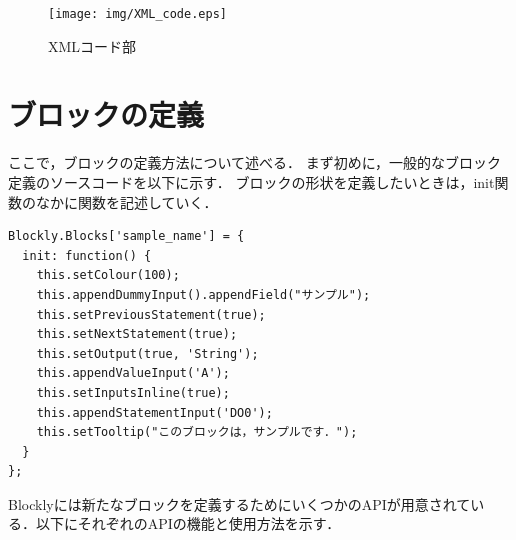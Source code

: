 \documentclass{risepaper}
\begin{document}



\begin{figure}[h]
\begin{center}
\texttt{[image: img/XML\_code.eps]}
\caption{XMLコード部}%
\label{fig:XML_code}
\end{center}%
\end{figure}%

   \section{ブロックの定義}
   
ここで，ブロックの定義方法について述べる．
まず初めに，一般的なブロック定義のソースコードを以下に示す．
ブロックの形状を定義したいときは，init関数のなかに関数を記述していく．

\begin{lstlisting}[basicstyle=\ttfamily\footnotesize]
Blockly.Blocks['sample_name'] = {
  init: function() {
    this.setColour(100);
    this.appendDummyInput().appendField("サンプル");
    this.setPreviousStatement(true);
    this.setNextStatement(true);
    this.setOutput(true, 'String');
    this.appendValueInput('A');
    this.setInputsInline(true);
    this.appendStatementInput('DO0');
    this.setTooltip("このブロックは，サンプルです．");
  }
};
\end{lstlisting}

Blocklyには新たなブロックを定義するためにいくつかのAPIが用意されている．以下にそれぞれのAPIの機能と使用方法を示す．
\end{document}
